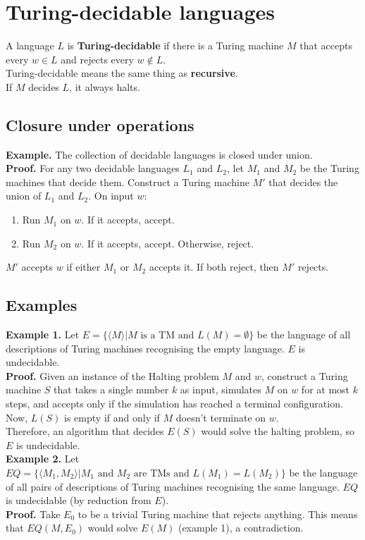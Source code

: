 \documentclass{article}
\begin{document}
\section{Turing-decidable languages}
A language $L$ is \textbf{Turing-decidable} if there is a Turing machine $M$ that accepts every $w \in L$ and rejects every $w \notin L$.
\\ Turing-decidable means the same thing as \textbf{recursive}.\medskip
\\If $M$ decides $L$, it always halts.

\subsection{Closure under operations}
\textbf{Example.} The collection of decidable languages is closed under union.
\\\textbf{Proof.} For any two decidable languages $L_1$ and $L_2$, let $M_1$ and $M_2$ be the Turing machines that decide them. Construct a Turing machine $M'$ that decides the union of $L_1$ and $L_2$. On input $w$:
\begin{enumerate}
	\item Run $M_1$ on $w$. If it accepts, accept.
	\item Run $M_2$ on $w$. If it accepts, accept. Otherwise, reject.
\end{enumerate}
$M'$ accepts $w$ if either $M_1$ or $M_2$ accepts it. If both reject, then $M'$ rejects.

\subsection{Examples}
\textbf{Example 1.} Let $E = \{\langle M\rangle|M\text{ is a TM and } L(M) = \emptyset\}$ be the language of all descriptions of Turing machines recognising the empty language. $E$ is undecidable.\medskip
\\\textbf{Proof.} Given an instance of the Halting problem $M$ and $w$, construct a Turing machine $S$ that takes a single number $k$ as input, simulates $M$ on $w$ for at most $k$ steps, and accepts only if the simulation has reached a terminal configuration.
\\ Now, $L(S)$ is empty if and only if $M$ doesn't terminate on $w$.
\\ Therefore, an algorithm that decides $E(S)$ would solve the halting problem, so $E$ is undecidable.\medskip
\\\textbf{Example 2.} Let $EQ = \{\langle M_1, M_2\rangle | M_1\text{ and }M_2\text{ are TMs and }L(M_1) = L(M_2) \}$ be the language of all pairs of descriptions of Turing machines recognising the same language. $EQ$ is undecidable (by reduction from $E$).\medskip
\\\textbf{Proof.} Take $E_0$ to be a trivial Turing machine that rejects anything. This means that $EQ(M, E_0)$ would solve $E(M)$ (example 1), a contradiction.
\end{document}
